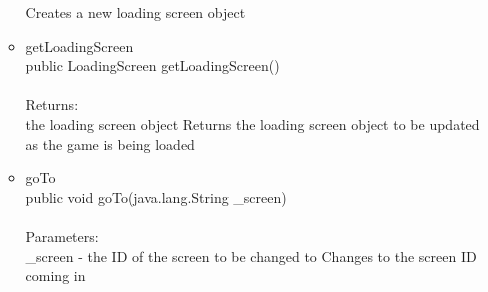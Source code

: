 \documentclass[letterpaper]{article}
\begin{document}
\begin{itemize}
\begin{itemize}
											Creates a new loading screen object
									\item	getLoadingScreen \\
											public LoadingScreen getLoadingScreen() \\ \\
											Returns: \\
											the loading screen object Returns the loading screen object to be updated as the game is being loaded
									\item	goTo \\
											public void goTo(java.lang.String \_screen) \\ \\
											Parameters: \\
											\_screen - the ID of the screen to be changed to Changes to the screen ID coming in
								\end{itemize}
					\end{itemize}
					
\end{document}
